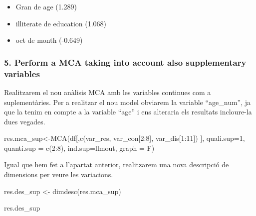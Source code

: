 \documentclass[
]{article}
\newenvironment{Shaded}{\begin{snugshade}}{\end{snugshade}}
\newcommand{\AttributeTok}[1]{\textcolor[rgb]{0.77,0.63,0.00}{#1}}
\newcommand{\DecValTok}[1]{\textcolor[rgb]{0.00,0.00,0.81}{#1}}
\newcommand{\FunctionTok}[1]{\textcolor[rgb]{0.00,0.00,0.00}{#1}}
\newcommand{\NormalTok}[1]{#1}
\newcommand{\OtherTok}[1]{\textcolor[rgb]{0.56,0.35,0.01}{#1}}
\newcommand{\SpecialCharTok}[1]{\textcolor[rgb]{0.00,0.00,0.00}{#1}}
\begin{document}
\begin{itemize}
\item
  Gran de age (1.289)
\item
  illiterate de education (1.068)
\item
  oct de month (-0.649)
\end{itemize}

\hypertarget{perform-a-mca-taking-into-account-also-supplementary-variables}{%
\subsubsection{5. Perform a MCA taking into account also supplementary
variables}\label{perform-a-mca-taking-into-account-also-supplementary-variables}}

Realitzarem el nou anàlisis MCA amb les variables continues com a
suplementàries. Per a realitzar el nou model obviarem la variable
``age\_num'', ja que la tenim en compte a la variable ``age'' i ens
alteraria els resultats incloure-la dues vegades.

\begin{Shaded}
\begin{Highlighting}[]
\NormalTok{res.mca\_sup}\OtherTok{\textless{}{-}}\FunctionTok{MCA}\NormalTok{(df[,}\FunctionTok{c}\NormalTok{(var\_res, var\_con[}\DecValTok{2}\SpecialCharTok{:}\DecValTok{8}\NormalTok{], var\_dis[}\DecValTok{1}\SpecialCharTok{:}\DecValTok{11}\NormalTok{]) ], }\AttributeTok{quali.sup=}\DecValTok{1}\NormalTok{,}
                 \AttributeTok{quanti.sup =} \FunctionTok{c}\NormalTok{(}\DecValTok{2}\SpecialCharTok{:}\DecValTok{8}\NormalTok{), }\AttributeTok{ind.sup=}\NormalTok{llmout, }\AttributeTok{graph =}\NormalTok{ F)}
\end{Highlighting}
\end{Shaded}

Igual que hem fet a l'apartat anterior, realitzarem una nova descripció
de dimensions per veure les variacions.

\begin{Shaded}
\begin{Highlighting}[]
\NormalTok{res.des\_sup }\OtherTok{\textless{}{-}} \FunctionTok{dimdesc}\NormalTok{(res.mca\_sup)}
\end{Highlighting}
\end{Shaded}

\begin{Shaded}
\begin{Highlighting}[]
\NormalTok{res.des\_sup}
\end{Highlighting}
\end{Shaded}
\end{document}
